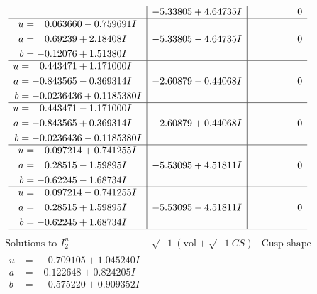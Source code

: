 \documentclass[1p]{elsarticle_modified}
\theoremstyle{definition}
\newcommand{\I}{\sqrt{-1}}
\begin{document}
$$\begin{array}{c|c|c}
 & -5.33805 + 4.64735 I & \phantom{-0.000000 } 0 \\ \hline\begin{aligned}
u &= \phantom{-}0.063660 - 0.759691 I \\
a &= \phantom{-}0.69239 + 2.18408 I \\
b &= -0.12076 + 1.51380 I\end{aligned}
 & -5.33805 - 4.64735 I & \phantom{-0.000000 } 0 \\ \hline\begin{aligned}
u &= \phantom{-}0.443471 + 1.171000 I \\
a &= -0.843565 - 0.369314 I \\
b &= -0.0236436 + 0.1185380 I\end{aligned}
 & -2.60879 - 0.44068 I & \phantom{-0.000000 } 0 \\ \hline\begin{aligned}
u &= \phantom{-}0.443471 - 1.171000 I \\
a &= -0.843565 + 0.369314 I \\
b &= -0.0236436 - 0.1185380 I\end{aligned}
 & -2.60879 + 0.44068 I & \phantom{-0.000000 } 0 \\ \hline\begin{aligned}
u &= \phantom{-}0.097214 + 0.741255 I \\
a &= \phantom{-}0.28515 - 1.59895 I \\
b &= -0.62245 - 1.68734 I\end{aligned}
 & -5.53095 + 4.51811 I & \phantom{-0.000000 } 0 \\ \hline\begin{aligned}
u &= \phantom{-}0.097214 - 0.741255 I \\
a &= \phantom{-}0.28515 + 1.59895 I \\
b &= -0.62245 + 1.68734 I\end{aligned}
 & -5.53095 - 4.51811 I & \phantom{-0.000000 } 0\\
 \hline 
 \end{array}$$\newpage$$\begin{array}{c|c|c}  
\text{Solutions to }I^u_{2}& \I (\text{vol} + \sqrt{-1}CS) & \text{Cusp shape}\\
 \hline 
\begin{aligned}
u &= \phantom{-}0.709105 + 1.045240 I \\
a &= -0.122648 + 0.824205 I \\
b &= \phantom{-}0.575220 + 0.909352 I\end{aligned}

\end{array}$$
\end{document}
